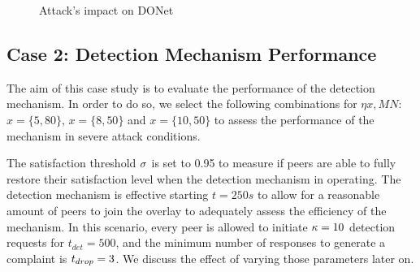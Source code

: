 \begin{figure}[t!]
\centering

  \mbox{}
 
  \mbox{}
  \caption{Attack's impact on DONet}
  \label{fig:attack-results}
  \end{figure}


\subsection{Case 2: Detection Mechanism Performance}

The aim of this case study is to evaluate the performance of the detection mechanism.
In order to do so, we select the following combinations for $\eta x, MN$: $x=\{5, 80\}$, $x=\{8, 50\}$ and $x=\{10, 50\}$ to assess the performance of the mechanism in severe attack conditions.

The satisfaction threshold $\sigma$ is set to 0.95 to measure if peers are able to fully restore their satisfaction level when the detection mechanism in operating.
The detection mechanism is effective starting $t=250s$ to allow for a reasonable amount of peers to join the overlay to adequately assess the efficiency of the mechanism.
In this scenario, every peer is allowed to initiate $\kappa=10$ detection requests for $t_{det}=500$, and the minimum number of responses to generate a complaint is $t_{drop}=3$. 
We discuss the effect of varying those parameters later on.

